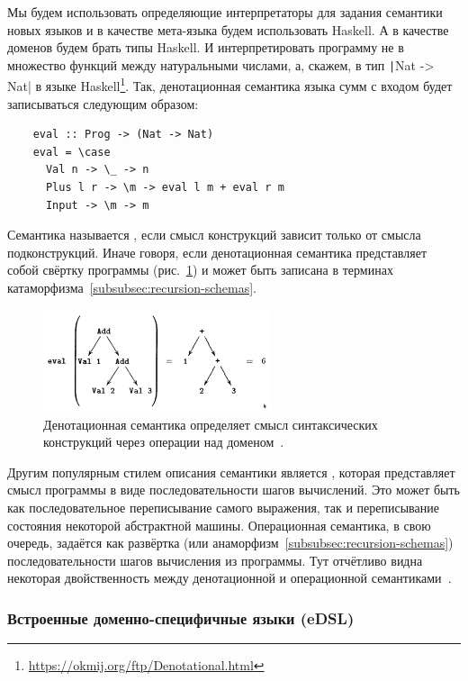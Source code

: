 Мы будем использовать определяющие интерпретаторы для задания семантики новых языков и в качестве мета-языка будем использовать Haskell.
А в качестве доменов будем брать типы Haskell.
И интерпретировать программу не в множество функций между натуральными числами, а, скажем, в тип \texttt|Nat -> Nat| в языке Haskell\footnote{\url{https://okmij.org/ftp/Denotational.html}}. %
Так, денотационная семантика языка сумм с входом будет записываться следующим образом:
\begin{verbatim}
    eval :: Prog -> (Nat -> Nat)
    eval = \case
      Val n -> \_ -> n
      Plus l r -> \m -> eval l m + eval r m
      Input -> \m -> m
\end{verbatim}

Семантика называется , если смысл конструкций зависит только от смысла подконструкций.
Иначе говоря, если денотационная семантика представляет собой свёртку программы (рис.\ \ref{fig:eval-prog}) и может быть записана в терминах катаморфизма~\ref{subsubsec:recursion-schemas}.

\begin{figure}[h]
    \centering
    \includegraphics[width=0.6\textwidth]{figs/eval-prog}
    \caption{Денотационная семантика определяет смысл синтаксических конструкций через операции над доменом~\cite{hutton1998fold}.}
    \label{fig:eval-prog}
\end{figure}

Другим популярным стилем описания семантики является , которая представляет смысл программы в виде последовательности шагов вычислений.
Это может быть как последовательное переписывание самого выражения, так и переписывание состояния некоторой абстрактной машины.
Операционная семантика, в свою очередь, задаётся как развёртка (или анаморфизм~\ref{subsubsec:recursion-schemas}) последовательности шагов вычисления из программы.
Тут отчётливо видна некоторая двойственность между денотационной и операционной семантиками~\cite{hutton1998fold}.

\subsubsection{Встроенные доменно-специфичные языки (eDSL)} \label{subsec:edsl}

